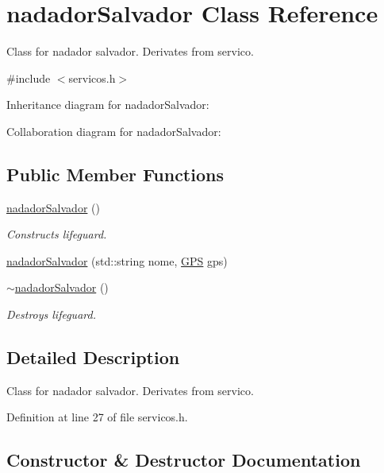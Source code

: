 \hypertarget{classnadadorSalvador}{}\section{nadador\+Salvador Class Reference}
\label{classnadadorSalvador}


Class for nadador salvador. Derivates from servico.  




{\ttfamily \#include $<$servicos.\+h$>$}



Inheritance diagram for nadador\+Salvador\+:


Collaboration diagram for nadador\+Salvador\+:
\subsection*{Public Member Functions}
\begin{DoxyCompactItemize}
\item 
\hyperlink{classnadadorSalvador_a81cc8699fe9ae9457ee81e81b8e8f7fd}{nadador\+Salvador} ()
\begin{DoxyCompactList}\small\item\em Constructs lifeguard. \end{DoxyCompactList}\item 
\hyperlink{classnadadorSalvador_a12066255a547b7d0d11f7b648ba7730a}{nadador\+Salvador} (std\+::string nome, \hyperlink{classGPS}{G\+PS} gps)
\item 
\hyperlink{classnadadorSalvador_ae1697c3f77c29eef36eda24be48ffb1f}{$\sim$nadador\+Salvador} ()
\begin{DoxyCompactList}\small\item\em Destroys lifeguard. \end{DoxyCompactList}\end{DoxyCompactItemize}


\subsection{Detailed Description}
Class for nadador salvador. Derivates from servico. 

Definition at line 27 of file servicos.\+h.



\subsection{Constructor \& Destructor Documentation}
